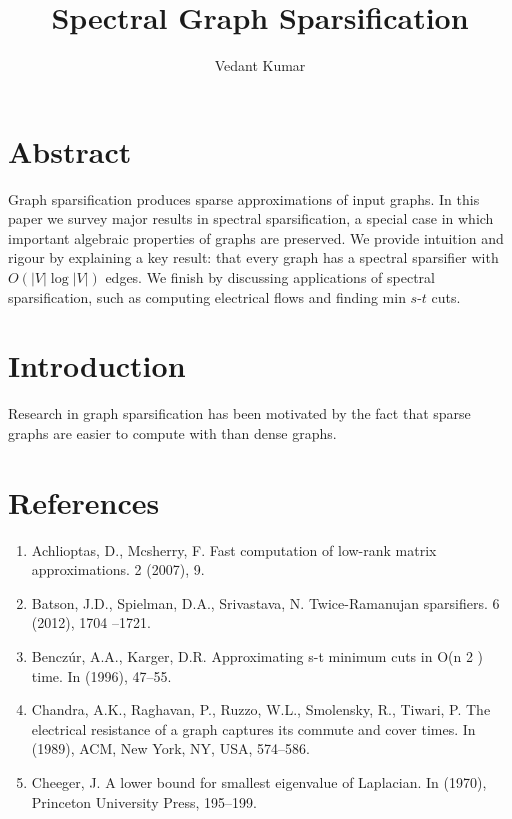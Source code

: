 \documentclass{article}
\title{Spectral Graph Sparsification}
\author{Vedant Kumar}
\begin{document}
\maketitle

\section*{Abstract}

Graph sparsification produces sparse approximations of input graphs.  In
this paper we survey major results in spectral sparsification, a special
case in which important algebraic properties of graphs are preserved.  We
provide intuition and rigour by explaining a key result: that every graph
has a spectral sparsifier with $O(|V|\log|V|)$ edges.  We finish by
discussing applications of spectral sparsification, such as computing
electrical flows and finding min $s$-$t$ cuts.

\section*{Introduction}

Research in graph sparsification has been motivated by the fact that sparse
graphs are easier to compute with than dense graphs. 

\section*{References}

\begin{enumerate}[1.]
    \item Achlioptas, D., Mcsherry, F. Fast computation of low-rank matrix
approximations. 2 (2007), 9.

    \item Batson, J.D., Spielman, D.A., Srivastava, N.  Twice-Ramanujan
sparsifiers. 6 (2012), 1704 –1721.

    \item Benczúr, A.A., Karger, D.R.  Approximating s-t minimum cuts in O(n 2
) time. In (1996), 47–55.

    \item Chandra, A.K., Raghavan, P., Ruzzo, W.L., Smolensky, R., Tiwari, P.
The electrical resistance of a graph captures its commute and cover times. In
(1989), ACM, New York, NY, USA, 574–586.

    \item Cheeger, J. A lower bound for smallest eigenvalue of Laplacian. In
(1970), Princeton University Press, 195–199.
\end{enumerate}
\end{document}
